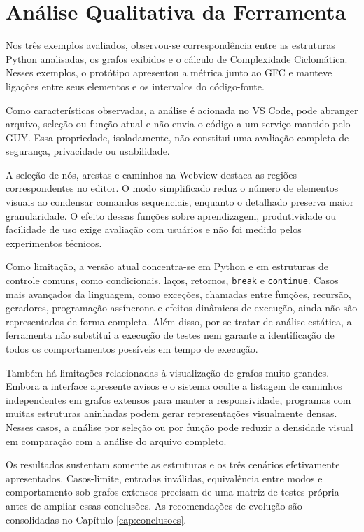 \section{Análise Qualitativa da Ferramenta}

Nos três exemplos avaliados, observou-se correspondência entre as estruturas Python analisadas, os grafos exibidos e o cálculo de Complexidade Ciclomática. Nesses exemplos, o protótipo apresentou a métrica junto ao GFC e manteve ligações entre seus elementos e os intervalos do código-fonte.

Como características observadas, a análise é acionada no VS Code, pode abranger arquivo, seleção ou função atual e não envia o código a um serviço mantido pelo GUY. Essa propriedade, isoladamente, não constitui uma avaliação completa de segurança, privacidade ou usabilidade.

A seleção de nós, arestas e caminhos na Webview destaca as regiões correspondentes no editor. O modo simplificado reduz o número de elementos visuais ao condensar comandos sequenciais, enquanto o detalhado preserva maior granularidade. O efeito dessas funções sobre aprendizagem, produtividade ou facilidade de uso exige avaliação com usuários e não foi medido pelos experimentos técnicos.

Como limitação, a versão atual concentra-se em Python e em estruturas de controle comuns, como condicionais, laços, retornos, \texttt{break} e \texttt{continue}. Casos mais avançados da linguagem, como exceções, chamadas entre funções, recursão, geradores, programação assíncrona e efeitos dinâmicos de execução, ainda não são representados de forma completa. Além disso, por se tratar de análise estática, a ferramenta não substitui a execução de testes nem garante a identificação de todos os comportamentos possíveis em tempo de execução.

Também há limitações relacionadas à visualização de grafos muito grandes. Embora a interface apresente avisos e o sistema oculte a listagem de caminhos independentes em grafos extensos para manter a responsividade, programas com muitas estruturas aninhadas podem gerar representações visualmente densas. Nesses casos, a análise por seleção ou por função pode reduzir a densidade visual em comparação com a análise do arquivo completo.

Os resultados sustentam somente as estruturas e os três cenários efetivamente apresentados. Casos-limite, entradas inválidas, equivalência entre modos e comportamento sob grafos extensos precisam de uma matriz de testes própria antes de ampliar essas conclusões. As recomendações de evolução são consolidadas no Capítulo \ref{cap:conclusoes}.
